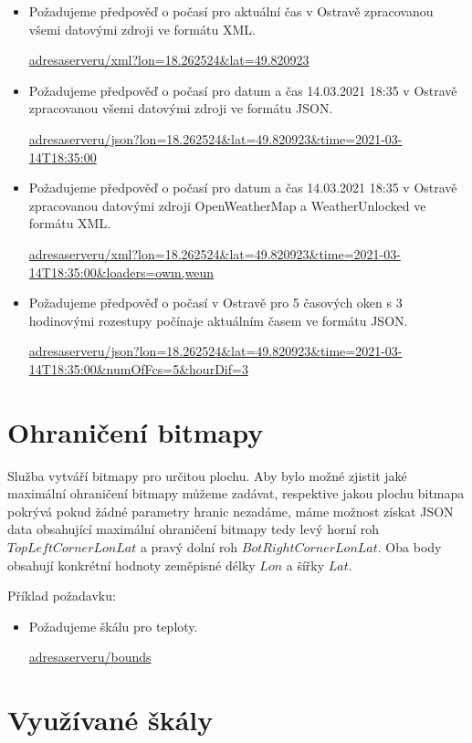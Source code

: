 \documentclass[czech,bachelor,dept460,male,csharp,cpdeclaration]{diploma}
\begin{document}
	\begin{itemize}
		\item Požadujeme předpověď o počasí pro aktuální čas v Ostravě zpracovanou všemi datovými zdroji ve formátu XML.
		
		\url{adresaserveru/xml?lon=18.262524\&lat=49.820923}
		
		\item Požadujeme předpověď o počasí pro datum a čas 14.03.2021 18:35 v Ostravě zpracovanou všemi datovými zdroji ve formátu JSON.
		
		\url{adresaserveru/json?lon=18.262524\&lat=49.820923\&time=2021-03-14T18:35:00}
		
		\item Požadujeme předpověď o počasí pro datum a čas 14.03.2021 18:35 v Ostravě zpracovanou datovými zdroji OpenWeatherMap a WeatherUnlocked ve formátu XML.
		
		\url{adresaserveru/xml?lon=18.262524\&lat=49.820923\&time=2021-03-14T18:35:00\&loaders=owm,weun}
		
		\item Požadujeme předpověď o počasí v Ostravě pro 5 časových oken s 3 hodinovými rozestupy počínaje aktuálním časem ve formátu JSON.
		
		\url{adresaserveru/json?lon=18.262524\&lat=49.820923\&time=2021-03-14T18:35:00\&numOfFcs=5\&hourDif=3}
		
	\end{itemize}
	
	\section{Ohraničení bitmapy}
	
	Služba vytváří bitmapy pro určitou plochu. Aby bylo možné zjistit jaké maximální ohraničení bitmapy můžeme zadávat, respektive jakou plochu bitmapa pokrývá pokud žádné parametry hranic nezadáme, máme možnost získat JSON data obsahující maximální ohraničení bitmapy tedy levý horní roh $TopLeftCornerLonLat$ a pravý dolní roh $BotRightCornerLonLat$. Oba body obsahují konkrétní hodnoty zeměpisné délky $Lon$ a šířky $Lat$.
	
	Příklad požadavku:
	\begin{itemize}
		\item Požadujeme škálu pro teploty.
	
		\url{adresaserveru/bounds}
	\end{itemize}

	\section{Využívané škály}
	
\end{document}
